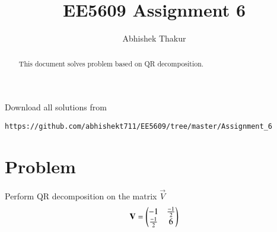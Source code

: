 \documentclass[journal,12pt,twocolumn]{IEEEtran}
\begin{document}
     \def\rightbox#1{\makebox[0in][r]{#1}}
     \def\centbox#1{\makebox[0in]{#1}}
     \def\topbox#1{\raisebox{-\baselineskip}[0in][0in]{#1}}
     \def\midbox#1{\raisebox{-0.5\baselineskip}[0in][0in]{#1}}
\vspace{3cm}
\title{EE5609 Assignment 6}
\author{Abhishek Thakur}
\maketitle
\newpage
\bigskip
\renewcommand{\thefigure}{\theenumi}
\renewcommand{\thetable}{\theenumi}
\begin{abstract}
This document solves problem based on QR decomposition.
\end{abstract}
\vspace{0.5cm}
%
Download all solutions from 
\begin{lstlisting}
https://github.com/abhishekt711/EE5609/tree/master/Assignment_6
\end{lstlisting}
%
%
\vspace{0.5mm}
\section{Problem}
Perform QR decomposition on the matrix $\vec{V}$ 
\begin{align}
\mathbf{V}=\begin{pmatrix}-1&\frac{-1}{2}\\\frac{-1}{2}&6\end{pmatrix} \label{eq:1}
\end{align}
\end{document}
